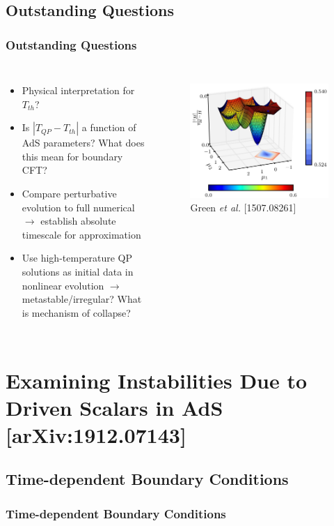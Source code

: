 \documentclass[mathserif,10pt]{beamer}
\newcommand{\bi}{\begin{itemize}}
\newcommand{\ei}{\end{itemize}}
\newcommand{\its}{\item}
\newcommand{\scr}{\scriptsize}
\begin{document}
\subsection{Outstanding Questions}
\frame
{
  \frametitle{Outstanding Questions}
  \begin{columns}
    \bi
    \its Physical interpretation for $T_{th}$?
    \its Is $| T_{QP} - T_{th}|$ a function of AdS parameters? What does this mean for boundary CFT?
    \its Compare perturbative evolution to full numerical $\to$ establish absolute timescale for approximation
    \its Use high-temperature QP solutions as initial data in nonlinear evolution $\to$ metastable/irregular? What is mechanism of collapse?
    \ei
    \begin{figure}
      \centering
      \includegraphics[width=\textwidth]{Green_hamiltonian} \\ {\scr Green {\it et al.} [1507.08261]}
    \end{figure}
  \end{columns}
}


\section{Examining Instabilities Due to Driven Scalars in AdS [arXiv:1912.07143]}
\subsection{Time-dependent Boundary Conditions}
\frame
{
  \frametitle{Time-dependent Boundary Conditions}
}
\end{document}
